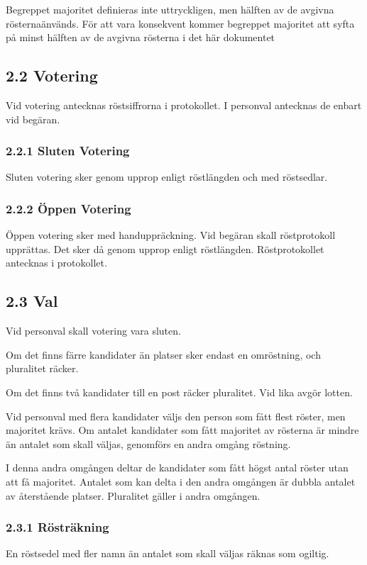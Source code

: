 \documentclass{dsekkallelse}
\begin{document}
Begreppet majoritet definieras inte uttryckligen, men hälften av de avgivna rösternaänvänds.
För att vara konsekvent kommer begreppet majoritet att syfta på minst hälften av de avgivna
rösterna i det här dokumentet
\subsection{2.2 Votering}
Vid votering antecknas röstsiffrorna i protokollet. I personval antecknas de enbart vid begäran.

\subsubsection{2.2.1 Sluten Votering}

 Sluten votering sker genom upprop enligt röstlängden och med röstsedlar.

\subsubsection{2.2.2 Öppen Votering}

Öppen votering sker med handuppräckning. Vid begäran skall röstprotokoll upprättas. Det
sker då genom upprop enligt röstlängden. Röstprotokollet antecknas i protokollet.

\subsection{2.3 Val}
Vid personval skall votering vara sluten.


Om det finns färre kandidater än platser sker endast en omröstning, och pluralitet räcker.


Om det finns två kandidater till en post räcker pluralitet. Vid lika avgör lotten.


Vid personval med flera kandidater väljs den person som fått flest röster, men majoritet krävs.
Om antalet kandidater som fått majoritet av rösterna är mindre än antalet som skall väljas,
genomförs en andra omgång röstning.


I denna andra omgången deltar de kandidater som fått högst antal röster utan att få majoritet.
Antalet som kan delta i den andra omgången är dubbla antalet av återstående platser. Pluralitet
gäller i andra omgången.

\subsubsection{2.3.1 Rösträkning}
En röstsedel med fler namn än antalet som skall väljas räknas som ogiltig.
\end{document}
